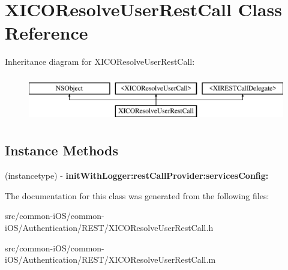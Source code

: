\hypertarget{interface_x_i_c_o_resolve_user_rest_call}{}\section{X\+I\+C\+O\+Resolve\+User\+Rest\+Call Class Reference}
\label{interface_x_i_c_o_resolve_user_rest_call}
Inheritance diagram for X\+I\+C\+O\+Resolve\+User\+Rest\+Call\+:\begin{figure}[H]
\begin{center}
\leavevmode
\includegraphics[height=2.000000cm]{interface_x_i_c_o_resolve_user_rest_call}
\end{center}
\end{figure}
\subsection*{Instance Methods}
\begin{DoxyCompactItemize}
\item 
\hypertarget{interface_x_i_c_o_resolve_user_rest_call_a4201e48dd4a49c38370278915341e536}{}\label{interface_x_i_c_o_resolve_user_rest_call_a4201e48dd4a49c38370278915341e536} 
(instancetype) -\/ {\bfseries init\+With\+Logger\+:rest\+Call\+Provider\+:services\+Config\+:}
\end{DoxyCompactItemize}


The documentation for this class was generated from the following files\+:\begin{DoxyCompactItemize}
\item 
src/common-\/i\+O\+S/common-\/i\+O\+S/\+Authentication/\+R\+E\+S\+T/X\+I\+C\+O\+Resolve\+User\+Rest\+Call.\+h\item 
src/common-\/i\+O\+S/common-\/i\+O\+S/\+Authentication/\+R\+E\+S\+T/X\+I\+C\+O\+Resolve\+User\+Rest\+Call.\+m\end{DoxyCompactItemize}
